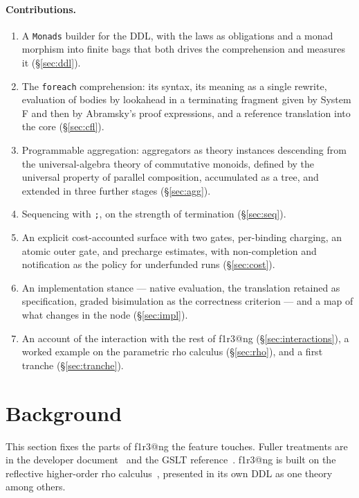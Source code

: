 \documentclass[11pt]{article}
\makeatletter
\theoremstyle{definition}
\theoremstyle{plain}
\theoremstyle{remark}
\newcommand{\rhoc}{\textsf{rho}}
\newcommand{\fe}{\texttt{foreach}}
\newcommand{\flang}{\textsf{f1r3\textbar @ng}}
\makeatother
\begin{document}
\paragraph{Contributions.}
\begin{enumerate}[nosep]
\item A \texttt{Monads} builder for the DDL, with the laws as obligations and a
monad morphism into finite bags that both drives the comprehension and measures
it (\S\ref{sec:ddl}).
\item The \fe{} comprehension: its syntax, its meaning as a single rewrite,
evaluation of bodies by lookahead in a terminating fragment given by System F
and then by Abramsky's proof expressions, and a reference translation into the
core (\S\ref{sec:cfl}).
\item Programmable aggregation: aggregators as theory instances descending
from the universal-algebra theory of commutative monoids, defined by the universal property of parallel
composition, accumulated as a tree, and extended in three further stages
(\S\ref{sec:agg}).
\item Sequencing with \texttt{;}, on the strength of termination
(\S\ref{sec:seq}).
\item An explicit cost-accounted surface with two gates, per-binding charging,
an atomic outer gate, and precharge estimates, with non-completion and
notification as the policy for underfunded runs
(\S\ref{sec:cost}).
\item An implementation stance --- native evaluation, the translation retained
as specification, graded bisimulation as the correctness criterion --- and a
map of what changes in the node (\S\ref{sec:impl}).
\item An account of the interaction with the rest of \flang{}
(\S\ref{sec:interactions}), a worked example on the parametric \rhoc{} calculus
(\S\ref{sec:rho}), and a first tranche (\S\ref{sec:tranche}).
\end{enumerate}

\section{Background}
\label{sec:background}

This section fixes the parts of \flang{} the feature touches. Fuller
treatments are in the developer document~\cite{F1R3Dev} and the GSLT
reference~\cite{GSLTintro}. \flang{} is built on the reflective higher-order
\rhoc{} calculus~\cite{MR05}, presented in its own DDL as one theory among
others.
\end{document}
